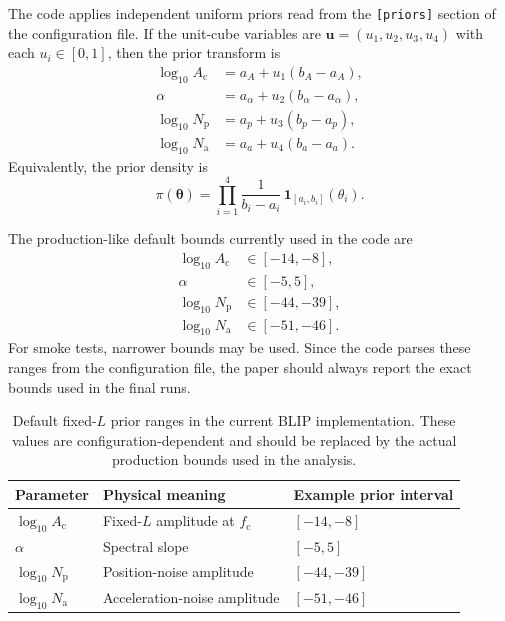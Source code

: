 \documentclass[11pt]{article}
\newcommand{\fc}{f_{\mathrm{c}}}
\newcommand{\vect}[1]{\bm{#1}}
\begin{document}
The code applies independent uniform priors read from the \texttt{[priors]} section of the configuration file. If the unit-cube variables are $\vect{u}=(u_1,u_2,u_3,u_4)$ with each $u_i \in [0,1]$, then the prior transform is
\begin{align}
  \log_{10} A_{\mathrm{c}} &= a_A + u_1(b_A-a_A), \\
  \alpha                  &= a_{\alpha} + u_2(b_{\alpha}-a_{\alpha}), \\
  \log_{10} N_{\mathrm{p}} &= a_p + u_3(b_p-a_p), \\
  \log_{10} N_{\mathrm{a}} &= a_a + u_4(b_a-a_a).
  \label{eq:prior-transform}
\end{align}
Equivalently, the prior density is
\begin{equation}
  \pi(\vect{\theta})
  =
  \prod_{i=1}^{4}
  \frac{1}{b_i-a_i}
  \,\mathbf{1}_{[a_i,b_i]}(\theta_i).
\end{equation}

The production-like default bounds currently used in the code are
\begin{align}
  \log_{10} A_{\mathrm{c}} &\in [-14,-8], \\
  \alpha &\in [-5,5], \\
  \log_{10} N_{\mathrm{p}} &\in [-44,-39], \\
  \log_{10} N_{\mathrm{a}} &\in [-51,-46].
\end{align}
For smoke tests, narrower bounds may be used. Since the code parses these ranges from the configuration file, the paper should always report the exact bounds used in the final runs.

\begin{table}[t]
\centering
\caption{Default fixed-$L$ prior ranges in the current BLIP implementation. These values are configuration-dependent and should be replaced by the actual production bounds used in the analysis.}
\begin{tabular}{lll}
\toprule
Parameter & Physical meaning & Example prior interval \\
\midrule
$\log_{10} A_{\mathrm{c}}$ & Fixed-$L$ amplitude at $\fc$ & $[-14,-8]$ \\
$\alpha$ & Spectral slope & $[-5,5]$ \\
$\log_{10} N_{\mathrm{p}}$ & Position-noise amplitude & $[-44,-39]$ \\
$\log_{10} N_{\mathrm{a}}$ & Acceleration-noise amplitude & $[-51,-46]$ \\
\bottomrule
\end{tabular}
\label{tab:priors}
\end{table}
\end{document}
